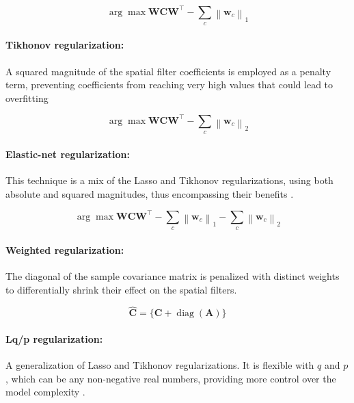 \begin{equation}
    \arg \max \mathbf{W} \mathbf{C} \mathbf{W}^{\top}-\sum_c\left\|\mathbf{w}_{{c}}\right\|_1
\end{equation}

\paragraph{Tikhonov regularization:} A squared magnitude of the spatial filter coefficients is employed as a penalty term, preventing coefficients from reaching very high values that could lead to overfitting \cite{fauzi2019energy}

\begin{equation}
    \arg \max \mathbf{W}\mathbf{C} \mathbf{W}^{\top}-\sum_c\left\|\mathbf{w}_{{c}}\right\|_2
\end{equation}

\paragraph{Elastic-net regularization:} This technique is a mix of the Lasso and Tikhonov regularizations, using both absolute and squared magnitudes, thus encompassing their benefits \cite{gu2021eeg}.

\begin{equation}
    \arg \max \mathbf{W}\mathbf{C} \mathbf{W}^{\top}-\sum_c\left\|\mathbf{w}_{{c}}\right\|_1-\sum_c\left\|\mathbf{w}_{{c}}\right\|_2
\end{equation}

\paragraph{Weighted regularization:} The diagonal of the sample covariance matrix is penalized with distinct weights to differentially shrink their effect on the spatial filters.\cite{deng2020local}

\begin{equation}
    \hat{\mathbf{C}}=\{\mathbf{C}+\operatorname{diag}(\mathbf{A})\}
\end{equation}

\paragraph{Lq/p regularization:} A generalization of Lasso and Tikhonov regularizations. It is flexible with $q$ and $p$, which can be any non-negative real numbers, providing more control over the model complexity \cite{cai2021single}.

